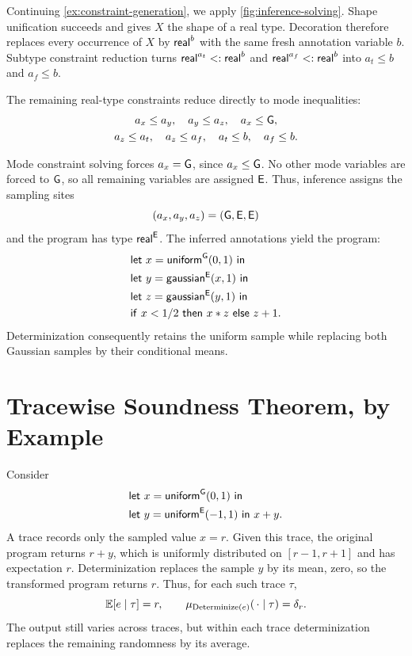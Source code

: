 \begin{example}
Continuing \cref{ex:constraint-generation}, we apply
\cref{fig:inference-solving}. Shape unification succeeds and gives $X$
the shape of a real type. Decoration therefore replaces every occurrence
of $X$ by $\mathsf{real}^{b}$ with the same fresh annotation variable $b$.
Subtype constraint reduction turns $\mathsf{real}^{a_t}<:\mathsf{real}^{b}$ and
$\mathsf{real}^{a_f}<:\mathsf{real}^{b}$ into $a_t\le b$ and $a_f\le b$.

The remaining real-type constraints reduce directly
to mode inequalities:
\[
\begin{gathered}
a_x\le a_y,\quad a_y\le a_z,\quad a_x\le\mathsf{G},\\
a_z\le a_t,\quad a_z\le a_f,\quad
a_t\le b,\quad a_f\le b.
\end{gathered}
\]

Mode constraint solving forces $a_x=\mathsf{G}$,
since $a_x\le\mathsf{G}$. No other mode variables are
forced to $\mathsf{G}$, so all remaining variables are
assigned $\mathsf{E}$.
Thus, inference assigns the sampling sites
\[
(a_x,a_y,a_z)=(\mathsf{G},\mathsf{E},\mathsf{E})
\]
and the program has type $\mathsf{real}^{\mathsf{E}}$.
The inferred annotations yield the program:
\[
\begin{aligned}
&\mathsf{let}\ x=\mathsf{uniform}^{\mathsf{G}}(0,1)\ \mathsf{in}\\
&\mathsf{let}\ y=\mathsf{gaussian}^{\mathsf{E}}(x,1)\ \mathsf{in}\\
&\mathsf{let}\ z=\mathsf{gaussian}^{\mathsf{E}}(y,1)\ \mathsf{in}\\
&\mathsf{if}\ x<1/2\ \mathsf{then}\ x*z\ \mathsf{else}\ z+1.
\end{aligned}
\]
Determinization consequently retains the uniform
sample while replacing both Gaussian samples by
their conditional means. 
\end{example}

\section{Tracewise Soundness Theorem, by Example}\label{sec:appendix-trace-soundness-example}
\begin{example}
Consider
\[
\begin{aligned}
  &\mathsf{let}\ x=\mathsf{uniform}^{\mathsf{G}}(0,1)\ \mathsf{in}\\
  &\mathsf{let}\ y=\mathsf{uniform}^{\mathsf{E}}(-1,1)\ \mathsf{in}\ x+y.
\end{aligned}
\]
A trace records only the sampled value $x=r$. Given this trace, the
original program returns $r+y$, which is uniformly distributed on
$[r-1,r+1]$ and has expectation $r$. Determinization replaces the
sample $y$ by its mean, zero, so the transformed program returns $r$.
Thus, for each such trace $\tau$,
\[
  \mathbb{E}[e\mid\tau]=r,
  \qquad
  \mu_{\operatorname{Determinize}(e)}(\,\cdot\mid\tau)=\delta_r.
\]
The output still varies across traces, but within each trace
determinization replaces the remaining randomness by its average.
\end{example}

